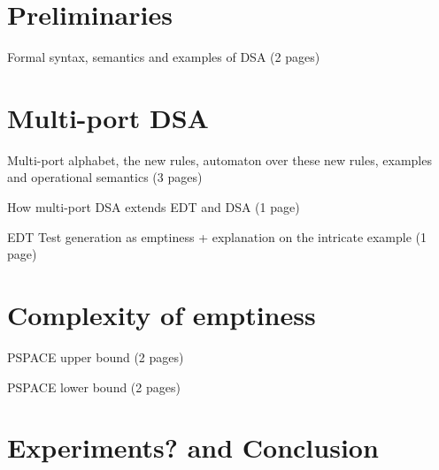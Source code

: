 \documentclass[runningheads,envcountsame]{llncs}
\begin{document}
  \section{Preliminaries}

  Formal syntax, semantics and examples of DSA (2 pages)

  \section{Multi-port DSA}

  Multi-port alphabet, the new rules, automaton over these new rules, examples and operational semantics (3 pages)

  How multi-port DSA extends EDT and DSA (1 page)

  EDT Test generation as emptiness + explanation on the intricate example (1 page)

  \section{Complexity of emptiness}

  PSPACE upper bound (2 pages)

  PSPACE lower bound (2 pages)

  \section{Experiments? and Conclusion}

  
  

  \appendix

  
  
\end{document}
